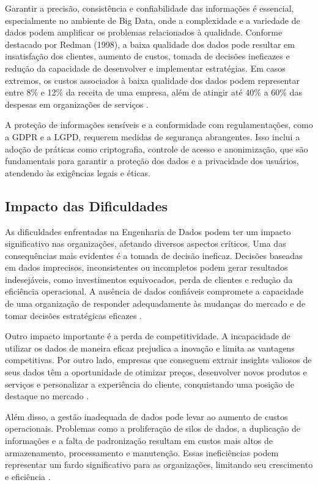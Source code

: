 Garantir a precisão, consistência e 
confiabilidade das informações é essencial, especialmente no ambiente de Big Data, onde a complexidade e a variedade 
de dados podem amplificar os problemas relacionados à qualidade. Conforme destacado por Redman (1998), a baixa 
qualidade dos dados pode resultar em insatisfação dos clientes, aumento de custos, tomada de decisões ineficazes 
e redução da capacidade de desenvolver e implementar estratégias. Em casos extremos, os custos associados à baixa 
qualidade dos dados podem representar entre 8\% e 12\% da receita de uma empresa, além de atingir até 40\% a 60\% das 
despesas em organizações de serviços \cite{impact_poor_data_1998}.

A proteção de informações sensíveis e 
a conformidade com regulamentações, como a GDPR e a LGPD, requerem medidas de segurança abrangentes. Isso inclui 
a adoção de práticas como criptografia, controle de acesso e anonimização, que são fundamentais para garantir a 
proteção dos dados e a privacidade dos usuários, atendendo às exigências legais e éticas.

\subsection{Impacto das Dificuldades}

As dificuldades enfrentadas na Engenharia de Dados podem ter um impacto significativo nas organizações, afetando 
diversos aspectos críticos. Uma das consequências mais evidentes é a tomada de decisão ineficaz. Decisões baseadas 
em dados imprecisos, inconsistentes ou incompletos podem gerar resultados indesejáveis, como investimentos equivocados, 
perda de clientes e redução da eficiência operacional. A ausência de dados confiáveis compromete a capacidade de uma 
organização de responder adequadamente às mudanças do mercado e de tomar decisões estratégicas eficazes \cite{stone2019information}.

Outro impacto importante é a perda de competitividade. A incapacidade de utilizar os dados de maneira eficaz prejudica 
a inovação e limita as vantagens competitivas. Por outro lado, empresas que conseguem extrair insights valiosos de 
seus dados têm a oportunidade de otimizar preços, desenvolver novos produtos e serviços e personalizar a experiência 
do cliente, conquistando uma posição de destaque no mercado \cite{impact_poor_data_1998}.

Além disso, a gestão inadequada de dados pode levar ao aumento de custos operacionais. Problemas como a proliferação 
de silos de dados, a duplicação de informações e a falta de padronização resultam em custos mais altos de armazenamento, 
processamento e manutenção. Essas ineficiências podem representar um fardo significativo para as organizações, limitando 
seu crescimento e eficiência \cite{impact_poor_data_1998}.

